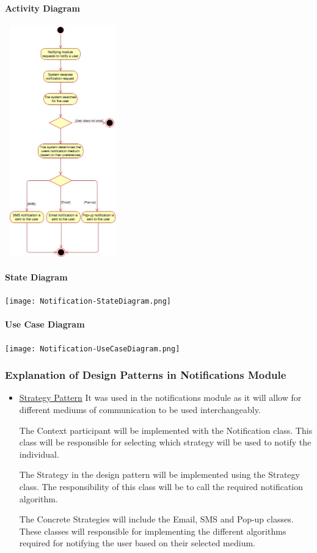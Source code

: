 \documentclass[runningheads,a4paper]{article}
\begin{document}
\paragraph{Activity Diagram}
\begin{center}
\includegraphics[height=10cm,width=5cm]{ActivityDiagram.png}\\ 
\end{center}
\paragraph{State Diagram}
\begin{center}
\texttt{[image: Notification-StateDiagram.png]}\\ 
\end{center}
\paragraph{Use Case Diagram}
\begin{center}
\texttt{[image: Notification-UseCaseDiagram.png]}\\ 
\end{center}

\subsubsection{Explanation of Design Patterns in Notifications Module}
\begin{itemize}
\item \underline{Strategy Pattern} It was used in the notifications module as it will allow for different mediums of communication to be used interchangeably.

The Context participant will be implemented with the Notification class. This class will be responsible for selecting which strategy will be used to notify the individual.

The Strategy in the design pattern will be implemented using the Strategy class. The responsibility of this class will be to call the required notification algorithm.

The Concrete Strategies will include the Email, SMS and Pop-up classes. These classes will responsible for implementing the different algorithms required for notifying the user based on their selected medium.
\end{itemize}
\end{document}
